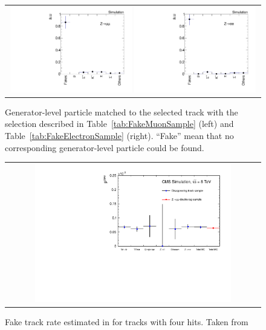 \begin{figure}[!bt]
  \centering 
  \begin{tabular}{c}
    \includegraphics[width=0.49\textwidth]{figures/analysis/Background/ParticleCompositionInFakeCS_Mu.pdf}
    \includegraphics[width=0.49\textwidth]{figures/analysis/Background/ParticleCompositionInFakeCS_Ele.pdf}
  \end{tabular}
  \caption{Generator-level particle matched to the selected track with the selection described in Table~\ref{tab:FakeMuonSample} (left) and Table~\ref{tab:FakeElectronSample} (right). ``Fake'' mean that no corresponding generator-level particle could be found. }
\vspace{30pt}
  \label{fig:BkgComposition}
\end{figure}

\begin{figure}[!bt]
  \centering 
  \begin{tabular}{c}
    \includegraphics[width=0.79\textwidth]{figures/analysis/Background/fakeTrkRates.pdf}
  \end{tabular}
  \caption{Fake track rate estimated in \cite{bib:CMS:DT_Thesis,bib:CMS:DT_8TeV_AN} for tracks with four hits. Taken from \cite{bib:CMS:DT_8TeV_AN} }
  \label{fig:FakeRate}
\vspace{30pt}
\end{figure}

